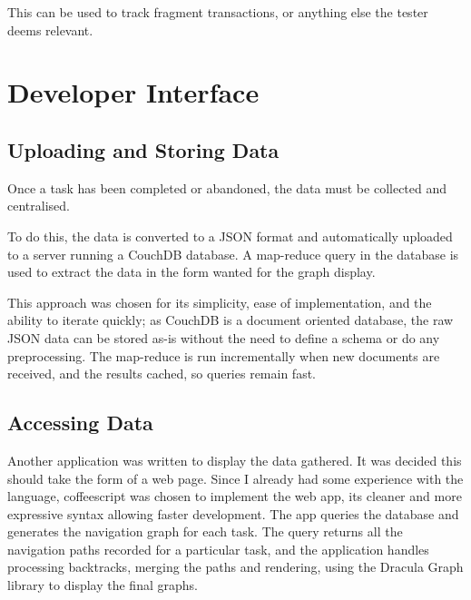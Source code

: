 This can be used to track fragment transactions, or anything else
the tester deems relevant.

\section{Developer Interface}

\subsection{Uploading and Storing Data}

Once a task has been completed or abandoned, the data must be
collected and centralised.

To do this, the data is converted to a JSON format and automatically
uploaded to a server running a CouchDB database. A map-reduce query
in the database is used to extract the data in the form wanted
for the graph display.

This approach was chosen for its simplicity, ease of implementation,
and the ability to iterate quickly; as CouchDB is a document oriented
database, the raw JSON data can be stored as-is without the need
to define a schema or do any preprocessing. The map-reduce is run
incrementally when new documents are received, and the results
cached, so queries remain fast.

\subsection{Accessing Data}

Another application was written to display the data gathered. It was
decided this should take the form of a web page. Since I already
had some experience with the language, coffeescript was chosen to
implement the web app, its cleaner and more expressive syntax
allowing faster development. The app queries the database and
generates the navigation graph for each task. The query returns all
the navigation paths recorded for a particular task, and the
application handles processing backtracks, merging the paths and
rendering, using the Dracula Graph library \cite{dracula-graph} to
display the final graphs.
